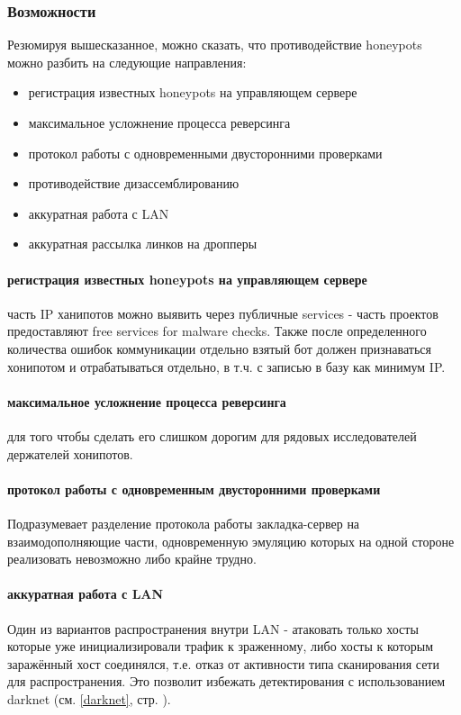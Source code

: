 \subsubsection{Возможности}

Резюмируя вышесказанное,  можно сказать, что противодействие honeypots
 можно разбить на следующие направления:

\begin{itemize}
\item{регистрация известных honeypots на управляющем сервере}
\item{максимальное усложнение процесса реверсинга}
\item{протокол работы с одновременными двусторонними проверками}
\item{противодействие дизассемблированию}
\item{аккуратная работа с LAN}
\item{аккуратная рассылка линков на дропперы}
\end{itemize}

\paragraph{регистрация известных honeypots на управляющем сервере}
часть IP ханипотов можно выявить через публичные services - часть проектов предоставляют free services for malware checks. Также после определенного количества ошибок коммуникации отдельно взятый бот должен признаваться хонипотом и отрабатываться отдельно, в т.ч. с записью в базу как минимум IP.

\paragraph{максимальное усложнение процесса реверсинга}
 для того чтобы сделать его слишком дорогим для рядовых исследователей
 держателей хонипотов.

\paragraph{протокол работы с одновременным двусторонними проверками\\}
Подразумевает разделение протокола работы закладка-сервер на взаимодополняющие части, одновременную эмуляцию которых на одной стороне реализовать невозможно либо крайне трудно.

\paragraph{аккуратная работа с LAN\\}
Один из вариантов распространения внутри LAN - атаковать только хосты которые уже инициализировали трафик к зраженному, либо хосты к которым заражённый хост соединялся,
т.е. отказ от активности типа сканирования сети для распространения. Это позволит избежать
 детектирования с использованием darknet (см. \ref{darknet}, стр. \pageref{darknet}).

